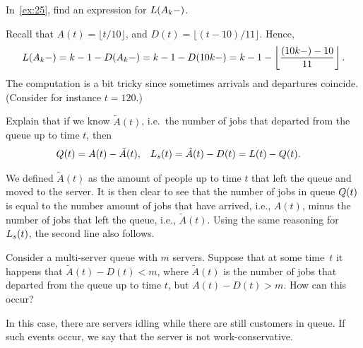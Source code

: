\begin{exercise}\label{ex:97} 
In~\cref{ex:25},  find an expression for $L(A_k-)$. 
\begin{solution}
Recall that $A(t) = \lfloor t/10\rfloor$, and $D(t) = \lfloor (t-10)/11 \rfloor$.
  Hence,
 \begin{equation*}
 L(A_k-) = k-1 - D(A_k-) = k- 1 - D(10k-) = k- 1 - \left \lfloor \frac{(10k-)-10}{11} \right \rfloor.
 \end{equation*}
 The computation is a bit tricky since sometimes arrivals and departures coincide. (Consider for instance $t=120$.)

\end{solution}
\end{exercise}


\begin{exercise} 
  Explain  that if we know $\tilde A(t)$, i.e.\ the number of jobs that departed from the queue up to time $t$, then
\begin{align*}
 Q(t) &= A(t) - \tilde A(t), & L_s(t) &= \tilde A(t) - D(t) = L(t) - Q(t).
\end{align*}
\begin{solution}
  We defined $\tilde A(t)$ as the amount of people up to time $t$ that left the queue and moved to the server.
  It is then clear to see that the number of jobs in queue $Q(t)$ is equal to the number amount of jobs that have arrived, i.e., $A(t)$, minus the number of jobs that left the queue, i.e., $\tilde A(t)$.
  Using the same reasoning for $L_s(t)$,  the second line also follows.
\end{solution}
\end{exercise}

\begin{exercise} 
  Consider
  a multi-server queue with $m$ servers.
  Suppose that at some time~$t$ it happens that $\tilde A(t) - D(t) < m$, where $\tilde A(t)$ is the number of jobs that departed from the queue up to time $t$, but $A(t) - D(t) > m$.
  How can this occur?
\begin{solution}
  In this case, there are servers idling while there are still customers in queue.
  If such events occur, we say that the server is not work-conservative.
\end{solution}
\end{exercise}


